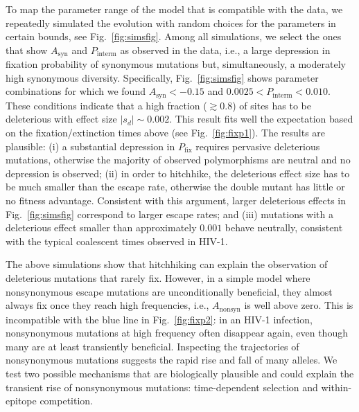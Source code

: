 \documentclass[rmp, twocolumn]{revtex4}
\newcommand{\pfix}{P_{\mathrm{fix}}}
\newcommand{\FIG}[1]{Fig.~\ref{fig:#1}}
\begin{document}
To map the parameter range of the model that is compatible with the data, we
repeatedly simulated the evolution with random choices for the parameters in
certain bounds, see \FIG{simsfig}. Among all simulations, we select the ones
that show $A_\text{syn}$ and $P_\text{interm}$ as observed in the data, i.e., a
large depression in fixation probability of synonymous mutations but,
simultaneously, a moderately high synonymous diversity. Specifically,
\FIG{simsfig} shows parameter combinations for which we found $A_\text{syn} <
-0.15$ and $0.0025 < P_\text{interm} < 0.010$. These conditions indicate that a
high fraction ($\gtrsim 0.8$) of sites has to be deleterious with effect size
$|s_d| \sim 0.002$.  This result fits well the expectation based on the
fixation/extinction times above (see \FIG{fixp1}). The results are plausible:
(i) a substantial depression in $\pfix$ requires pervasive deleterious
mutations, otherwise the majority of observed polymorphisms are neutral and no
depression is observed; (ii) in order to hitchhike, the deleterious effect size
has to be much smaller than the escape rate, otherwise the double mutant has
little or no fitness advantage. Consistent with this argument, larger
deleterious effects in \FIG{simsfig} correspond to larger escape rates; and (iii)
mutations with a deleterious effect smaller than approximately $0.001$ behave
neutrally, consistent with the typical coalescent times observed in HIV-1.

The above simulations show that hitchhiking can explain the observation of
deleterious mutations that rarely fix. However, in a simple model where
nonsynonymous escape mutations are unconditionally beneficial, they almost
always fix once they reach high frequencies, i.e., $A_{\mathrm{nonsyn}}$ is well
above zero. This is incompatible with the blue line in \FIG{fixp2}: in an HIV-1
infection, nonsynonymous mutations at high frequency often disappear again, even
though many are at least transiently beneficial. Inspecting the trajectories of
nonsynonymous mutations suggests the rapid rise and fall of many alleles. We
test two possible mechanisms that are biologically plausible and could explain
the transient rise of nonsynonymous mutations: time-dependent selection and
within-epitope competition.
\end{document}
